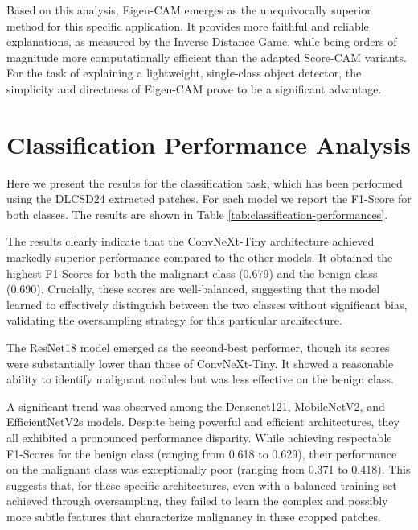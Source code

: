 Based on this analysis, Eigen-CAM emerges as the unequivocally superior method for this specific application. It provides more faithful and reliable explanations, as measured by the Inverse Distance Game, while being orders of magnitude more computationally efficient than the adapted Score-CAM variants. For the task of explaining a lightweight, single-class object detector, the simplicity and directness of Eigen-CAM prove to be a significant advantage.


\section{Classification Performance Analysis}
Here we present the results for the classification task, which has been performed using the DLCSD24 extracted patches. For each model we report the F1-Score for both classes. The results are shown in Table \ref{tab:classification-performances}.



The results clearly indicate that the ConvNeXt-Tiny architecture achieved markedly superior performance compared to the other models. It obtained the highest F1-Scores for both the malignant class (0.679) and the benign class (0.690). Crucially, these scores are well-balanced, suggesting that the model learned to effectively distinguish between the two classes without significant bias, validating the oversampling strategy for this particular architecture.

The ResNet18 model emerged as the second-best performer, though its scores were substantially lower than those of ConvNeXt-Tiny. It showed a reasonable ability to identify malignant nodules but was less effective on the benign class.

A significant trend was observed among the Densenet121, MobileNetV2, and EfficientNetV2s models. Despite being powerful and efficient architectures, they all exhibited a pronounced performance disparity. While achieving respectable F1-Scores for the benign class (ranging from 0.618 to 0.629), their performance on the malignant class was exceptionally poor (ranging from 0.371 to 0.418). This suggests that, for these specific architectures, even with a balanced training set achieved through oversampling, they failed to learn the complex and possibly more subtle features that characterize malignancy in these cropped patches.

